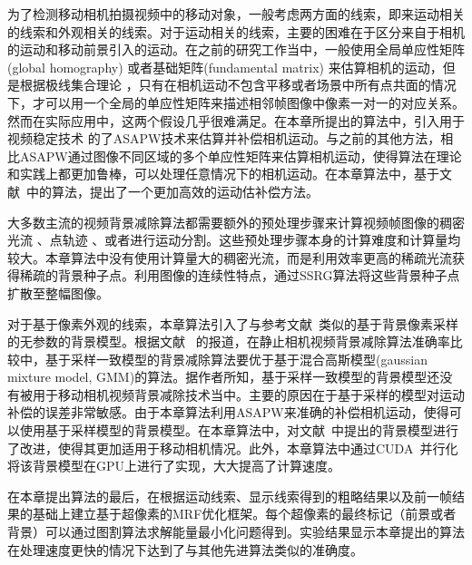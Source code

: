 为了检测移动相机拍摄视频中的移动对象，一般考虑两方面的线索，即来运动相关的线索和外观相关的线索。对于运动相关的线索，主要的困难在于区分来自于相机的运动和移动前景引入的运动。在之前的研究工作当中，一般使用全局单应性矩阵(global homography)\cite{5.8s,LiuCVPR09} 或者基础矩阵(fundamental matrix) \cite{kwak2011Generalized,LimPRFloating}来估算相机的运动，但是根据极线集合理论 \cite{Multitransform}，只有在相机运动不包含平移或者场景中所有点共面的情况下，才可以用一个全局的单应性矩阵来描述相邻帧图像中像素一对一的对应关系。然而在实际应用中，这两个假设几乎很难满足。在本章所提出的算法中，引入用于视频稳定技术\cite{Liu2009ASAP,Liu_2013ASAP} 的了ASAPW技术来估算并补偿相机运动。与之前的其他方法，相比ASAPW通过图像不同区域的多个单应性矩阵来估算相机运动，使得算法在理论和实践上都更加鲁棒，可以处理任意情况下的相机运动。在本章算法中，基于文献~中的算法，提出了一个更加高效的运动估补偿方法。\par

大多数主流的视频背景减除算法都需要额外的预处理步骤来计算视频帧图像的稠密光流 \cite{Multitransform,gbsuperpixel}、点轨迹 \cite{iccv2009,Cui2012,SubspaceTracking}、或者进行运动分割\cite{kwak2011Generalized}。这些预处理步骤本身的计算难度和计算量均较大。本章算法中没有使用计算量大的稠密光流，而是利用效率更高的稀疏光流获得稀疏的背景种子点。利用图像的连续性特点，通过SSRG算法将这些背景种子点扩散至整幅图像。\par

对于基于像素外观的线索，本章算法引入了与参考文献~类似的基于背景像素采样的无参数的背景模型。根据文献
 ~的报道，在静止相机视频背景减除算法准确率比较中，基于采样一致模型的背景减除算法要优于基于混合高斯模型(gaussian mixture model, GMM)的算法。据作者所知，基于采样一致模型的背景模型还没有被用于移动相机视频背景减除技术当中。主要的原因在于基于采样的模型对运动补偿的误差非常敏感。由于本章算法利用ASAPW来准确的补偿相机运动，使得可以使用基于采样模型的背景模型。在本章算法中，对文献~中提出的背景模型进行了改进，使得其更加适用于移动相机情况。此外，本章算法中通过CUDA~\cite{CUDA}并行化将该背景模型在GPU上进行了实现，大大提高了计算速度。\par

 在本章提出算法的最后，在根据运动线索、显示线索得到的粗略结果以及前一帧结果的基础上建立基于超像素的MRF优化框架。每个超像素的最终标记（前景或者背景）可以通过图割算法\cite{graphcut04}求解能量最小化问题得到。实验结果显示本章提出的算法在处理速度更快的情况下达到了与其他先进算法类似的准确度。


